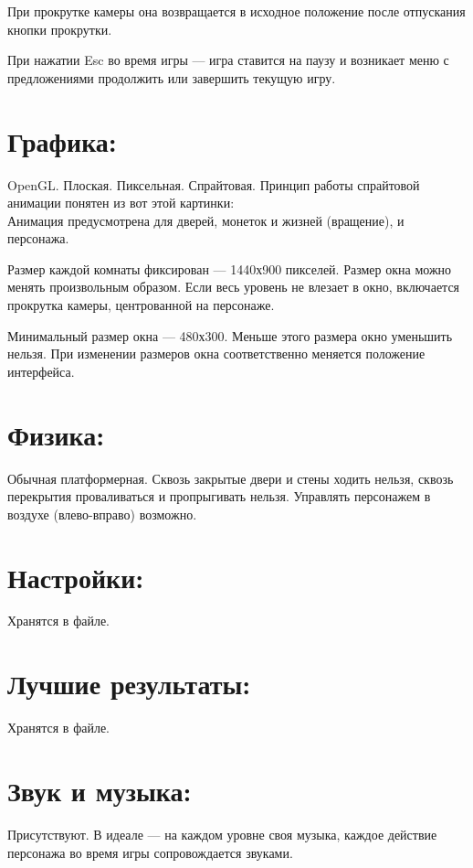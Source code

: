 \documentclass[12pt,a4paper]{article}
\begin{document}
При прокрутке камеры она возвращается в исходное положение после отпускания кнопки прокрутки.

При нажатии Esc во время игры --- игра ставится на паузу и возникает меню с предложениями продолжить или завершить текущую игру.\\

\section{Графика:}
OpenGL. Плоская. Пиксельная. Спрайтовая. Принцип работы спрайтовой анимации понятен из вот этой картинки:\\
Анимация предусмотрена для дверей, монеток и жизней (вращение), и персонажа.

Размер каждой комнаты фиксирован --- 1440х900 пикселей. Размер окна можно менять произвольным образом. Если весь уровень не влезает в окно, включается прокрутка камеры, центрованной на персонаже.

Минимальный размер окна --- 480х300. Меньше этого размера окно уменьшить нельзя. При изменении размеров окна соответственно меняется положение интерфейса.\\

\section{Физика:}
Обычная платформерная. Сквозь закрытые двери и стены ходить нельзя, сквозь перекрытия проваливаться и пропрыгивать нельзя. Управлять персонажем в воздухе (влево-вправо) возможно.\\

\section{Настройки:}
Хранятся в файле.\\

\section{Лучшие результаты:}
Хранятся в файле.\\

\section{Звук и музыка:}
Присутствуют. В идеале --- на каждом уровне своя музыка, каждое действие персонажа во время игры сопровождается звуками.
\end{document}
